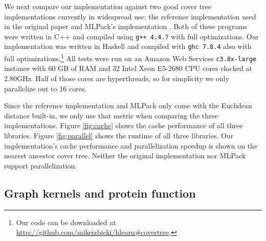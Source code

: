 \documentclass[../main.tex]{subfiles}
\begin{document}
We next compare our implementation against two good cover tree implementations currently in widespread use:
the reference implementation used in the original paper \cite{beygelzimer2006cover}
and MLPack's implementation \cite{curtin2013mlpack}.
Both of these programs were written in C++ and compiled using \texttt{g++ 4.4.7} with full optimizations.
Our implementation was written in Haskell and compiled with \texttt{ghc 7.8.4} also with full optimizations.\footnote{Our code can be downloaded at \url{http://github.com/mikeizbicki/hlearn\#covertree}.}
All tests were run on an Amazon Web Services \texttt{c3.8x-large} instance with 60 GB of RAM and 32 Intel Xeon E5-2680 CPU cores clocked at 2.80GHz.
Half of those cores are hyperthreads, so for simplicity we only parallelize out to 16 cores.

Since the reference implementation and MLPack only come with the Euclidean distance built-in, we only use that metric when comparing the three implementations.
Figure \ref{fig:cache} shows the cache performance of all three libraries.
Figure \ref{fig:parallel} shows the runtime of all three libraries.
Our implementation's cache performance and parallelization speedup is shown on the nearest ancestor cover tree.
Neither the original implementation nor MLPack support parallelization.

\subsection{Graph kernels and protein function}
\end{document}
